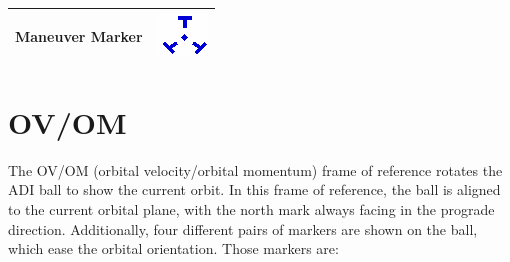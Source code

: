 \documentclass[paper=a4, 11 pt]{report}
\begin{document}
\renewcommand{\arraystretch}{2.7}
\begin{center}
\begin{tabular}{ |c  c | }
  \hline
  Maneuver Marker & \includegraphics[scale=.5]{maneuver.png} \\ \hline
\end{tabular}
\end{center}


\section{OV/OM}
The OV/OM (orbital velocity/orbital momentum) frame of reference rotates the ADI ball to show the current orbit.
In this frame of reference, the ball is aligned to the current orbital plane, with the north mark always facing in the prograde direction.
Additionally, four different pairs of markers are shown on the ball, which ease the orbital orientation.
Those markers are:
\end{document}
